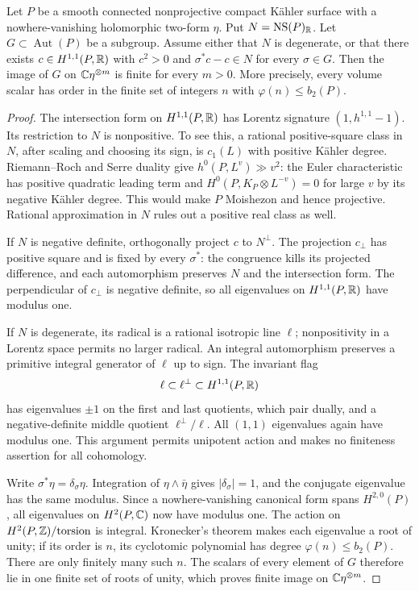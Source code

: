 \begin{lemma}\label{lem:lattice-scalar}
Let \(P\) be a smooth connected nonprojective compact K\"ahler surface
with a nowhere-vanishing holomorphic two-form \(\eta\).  Put
\(N=\operatorname{NS}(P)_\mathbb R\).  Let \(G\subset\operatorname{Aut}(P)\) be a subgroup.
Assume either that \(N\) is degenerate, or that there exists
\(c\in H^{1,1}(P,\mathbb R)\) with \(c^2>0\) and
\(\sigma^*c-c\in N\) for every \(\sigma\in G\).  Then the image of
\(G\) on \(\mathbb C\eta^{\otimes m}\) is finite for every \(m>0\).
More precisely, every volume scalar has order in the finite set of
integers \(n\) with \(\varphi(n)\leq b_2(P)\).
\end{lemma}
\begin{proof}
The intersection form on \(H^{1,1}(P,\mathbb R)\) has Lorentz signature
\((1,h^{1,1}-1)\).  Its restriction to \(N\) is nonpositive.  To see
this, a rational positive-square class in \(N\), after scaling and
choosing its sign, is \(c_1(L)\) with positive K\"ahler degree.
Riemann--Roch and Serre duality give \(h^0(P,L^v)\gg v^2\): the Euler
characteristic has positive quadratic leading term and
\(H^0(P,K_P\otimes L^{-v})=0\) for large \(v\) by its negative K\"ahler
degree.  This would make \(P\) Moishezon and hence projective.  Rational
approximation in \(N\) rules out a positive real class as well.

If \(N\) is negative definite, orthogonally project \(c\) to \(N^\perp\).
The projection \(c_\perp\) has positive square and is fixed by every
\(\sigma^*\): the congruence kills its projected difference, and each
automorphism preserves \(N\) and the intersection form.  The perpendicular
of \(c_\perp\) is negative definite, so all eigenvalues on
\(H^{1,1}(P,\mathbb R)\) have modulus one.

If \(N\) is degenerate, its radical is a rational isotropic line
\(\ell\); nonpositivity in a Lorentz space permits no larger radical.
An integral automorphism preserves a primitive integral generator of
\(\ell\) up to sign.  The invariant flag
\[
 \ell\subset\ell^\perp\subset H^{1,1}(P,\mathbb R)
\]
has eigenvalues \(\pm1\) on the first and last quotients, which pair
dually, and a negative-definite middle quotient \(\ell^\perp/\ell\).
All \((1,1)\) eigenvalues again have modulus one.  This argument permits
unipotent action and makes no finiteness assertion for all cohomology.

Write \(\sigma^*\eta=\delta_\sigma\eta\).  Integration of
\(\eta\wedge\bar\eta\) gives \(|\delta_\sigma|=1\), and the conjugate
eigenvalue has the same modulus.  Since a nowhere-vanishing canonical form
spans \(H^{2,0}(P)\), all eigenvalues on \(H^2(P,\mathbb C)\) now have modulus
one.  The action on \(H^2(P,\mathbb Z)/\mathrm{torsion}\) is integral.  Kronecker's
theorem makes each eigenvalue a root of unity; if its order is \(n\), its
cyclotomic polynomial has degree \(\varphi(n)\leq b_2(P)\).  There are
only finitely many such \(n\).  The scalars of every element of \(G\)
therefore lie in one finite set of roots of unity, which proves finite
image on \(\mathbb C\eta^{\otimes m}\).
\end{proof}

